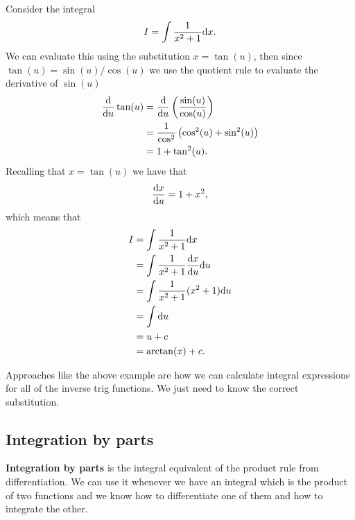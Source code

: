\begin{ex}
Consider the integral 
\begin{equation*}
I=\int \frac{1}{x^{2}+1}\mathrm{d} x.
\end{equation*}
We can evaluate this using the substitution $x=\tan(u)$, then since $\tan(u)=\sin(u)/\cos(u)$ we use the quotient rule to evaluate the derivative of $\sin(u)$
\begin{align*}
\frac{\mathrm{d}}{\mathrm{d} u}\tan(u)	&=\frac{\mathrm{d} }{\mathrm{d} u}\left(\frac{\sin(u)}{\cos(u)}\right)\\
					&=\frac{1}{\cos^{2}}\left(\cos^{2}(u)+\sin^{2}(u)\right)\\
					&=1+\tan^{2}(u).
\end{align*}
Recalling that $x=\tan(u)$ we have that
\begin{equation*}
\frac{\mathrm{d} x}{\mathrm{d} u}=1+x^{2},
\end{equation*}
which means that
\begin{align*}
I 	&=\int \frac{1}{x^{2}+1}\mathrm{d} x\\
	&=\int \frac{1}{x^{2}+1}\frac{\mathrm{d} x}{\mathrm{d} u}\mathrm{d} u\\
	&=\int \frac{1}{x^{2}+1}(x^{2}+1)\mathrm{d} u\\
	&=\int \mathrm{d} u\\
	&=u+c\\
	&=\arctan(x)+c.
\end{align*}
\end{ex}

Approaches like the above example are how we can calculate integral expressions for all of the inverse trig functions. We just need to know the correct substitution. 

\subsection*{Integration by parts}
\textbf{Integration by parts} is the integral equivalent of the product rule from differentiation. We can use it whenever we have an integral which is the product of two functions and we know how to differentiate one of them and how to integrate the other. \\

